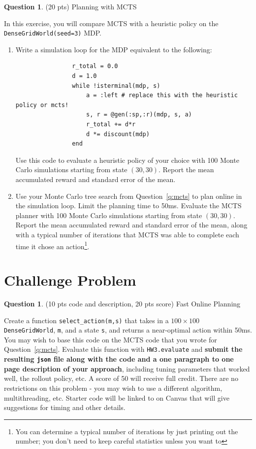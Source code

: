 \documentclass{article}
\theoremstyle{definition}
\newtheorem{question}[thm]{Question}
\begin{document}
\begin{question}
    (20 pts) Planning with MCTS

    In this exercise, you will compare MCTS with a heuristic policy on the \texttt{DenseGridWorld(seed=3)} MDP.

    \begin{enumerate}[label=\alph*)]
        \item Write a simulation loop for the MDP equivalent to the following:
            \begin{verbatim}
                r_total = 0.0
                d = 1.0
                while !isterminal(mdp, s)
                    a = :left # replace this with the heuristic policy or mcts!
                    s, r = @gen(:sp,:r)(mdp, s, a)
                    r_total += d*r
                    d *= discount(mdp)
                end
            \end{verbatim} Use this code to evaluate a heuristic policy of your choice with 100 Monte Carlo simulations starting from state $(30, 30)$. Report the mean accumulated reward and standard error of the mean.
        \item Use your Monte Carlo tree search from Question~\ref{q:mcts} to plan online in the simulation loop. Limit the planning time to 50ms. Evaluate the MCTS planner with 100 Monte Carlo simulations starting from state $(30, 30)$. Report the mean accumulated reward and standard error of the mean, along with a typical number of iterations that MCTS was able to complete each time it chose an action\footnote{You can determine a typical number of iterations by just printing out the number; you don't need to keep careful statistics unless you want to}.
    \end{enumerate}


\end{question}

\section{Challenge Problem}

\begin{question}
    (10 pts code and description, 20 pts score) Fast Online Planning
    
    Create a function \texttt{select\_action(m,s)} that takes in a $100 \times 100$ \texttt{DenseGridWorld}, \texttt{m}, and a state \texttt{s}, and returns a near-optimal action within 50ms. You may wish to base this code on the MCTS code that you wrote for Question~\ref{q:mcts}. Evaluate this function with \texttt{HW3.evaluate} and \textbf{submit the resulting \texttt{json} file along with the code and a one paragraph to one page description of your approach}, including tuning parameters that worked well, the rollout policy, etc. A score of 50 will receive full credit. There are no restrictions on this problem - you may wish to use a different algorithm, multithreading, etc. Starter code will be linked to on Canvas that will give suggestions for timing and other details.
\end{question}
\end{document}
